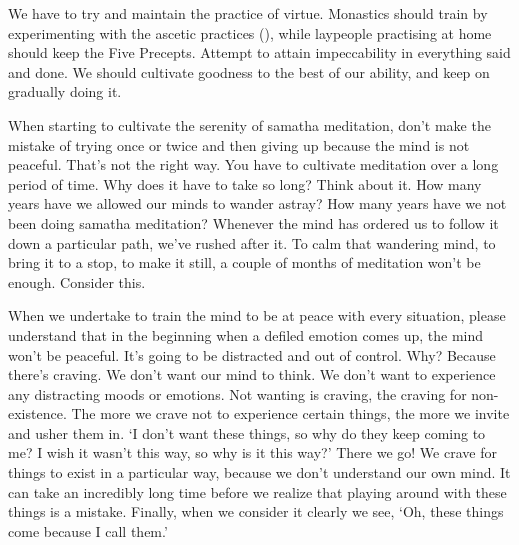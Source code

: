 We have to try and maintain the practice of virtue. Monastics should train by experimenting with the ascetic practices (), while laypeople practising at home should keep the Five Precepts. Attempt to attain impeccability in everything said and done. We should cultivate goodness to the best of our ability, and keep on gradually doing it.

When starting to cultivate the serenity of samatha meditation, don't make the mistake of trying once or twice and then giving up because the mind is not peaceful. That's not the right way. You have to cultivate meditation over a long period of time. Why does it have to take so long? Think about it. How many years have we allowed our minds to wander astray? How many years have we not been doing samatha meditation? Whenever the mind has ordered us to follow it down a particular path, we've rushed after it. To calm that wandering mind, to bring it to a stop, to make it still, a couple of months of meditation won't be enough. Consider this.

When we undertake to train the mind to be at peace with every situation, please understand that in the beginning when a defiled emotion comes up, the mind won't be peaceful. It's going to be distracted and out of control. Why? Because there's craving. We don't want our mind to think. We don't want to experience any distracting moods or emotions. Not wanting is craving, the craving for non-existence. The more we crave not to experience certain things, the more we invite and usher them in. `I don't want these things, so why do they keep coming to me? I wish it wasn't this way, so why is it this way?' There we go! We crave for things to exist in a particular way, because we don't understand our own mind. It can take an incredibly long time before we realize that playing around with these things is a mistake. Finally, when we consider it clearly we see, `Oh, these things come because I call them.'


